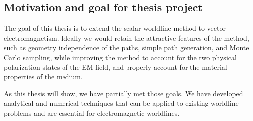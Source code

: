 
\subsection{Motivation and goal for thesis project}

The goal of this thesis is to extend the scalar worldline method to vector electromagnetism.
Ideally we would retain the attractive features of the method, such as geometry independence of the paths,
simple path generation, and Monte Carlo sampling, while improving the method to account for the two physical polarization
states of the EM field, and properly account for the material properties of the medium.  

As this thesis will show, we have partially met those goals.  We have developed analytical
and numerical techniques that can be applied to existing worldline problems and are essential
for electromagnetic worldlines.  

